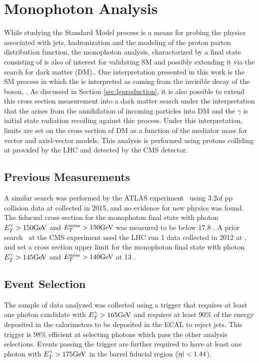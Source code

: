 
\chapter{Monophoton Analysis}\label{sec:lgxc}

While studying the Standard Model process \ppwbb is a means
 for probing the physics associated with jets,
 hadronization and the modeling of the proton 
 parton distribution function, the monophoton analysis,
 charactarized by a final state consisting of \gmet 
 is also of interest for validating SM and possibly extending it
 via the search for dark matter (DM)..
One interpretation presented in this work
 is the SM process \ppzgnng  in which the \met is interpreted as coming from the
 invisible decay of the \z boson, \znn.
As discussed in Section \ref{sec:lgproduction},
 it is also possible to extend this cross section measurement
 into a dark matter search under the interpretation 
 that the \met arises from the 
 annihilation of incoming particles into DM 
 and the $\gamma$ is initial state radiation 
 recoiling against thie process. 
Under this interpretation, limits are set on the
 cross section of DM as a function of the 
 mediator mass for vector and axiel-vector models. 
This analysis is performed using protons colliding at
  \TeV provided by the LHC and detected by
 the CMS detector.

\section{Previous Measurements}

A similar search was performed by the ATLAS experiment~\cite{Aaboud:2016uro}
 using 3.2\fbinv of pp collision data at  \TeV
 collected in 2015, and no evidence for new physics was found. 
The fiducual cross section for 
 the monophoton final state with photon $E_T^\gamma > 150 \mathrm{GeV}$
 and $E_T^{\mathrm{miss}} > 150 \mathrm{GeV}$ was measured to be below 17.8 \fbinv.
A prior search~\cite{Khachatryan:2014rwa} at the CMS 
 experiment used the LHC run 1 data collected in 2012 at
  \TeV, and set a cross section upper limit for the monophoton final
 state with photon $E_T^\gamma > 145\mathrm{GeV}$ and $E_T^{\mathrm{miss}} > 140\mathrm{GeV}$ at 13 \fbinv. 

\section{Event Selection}\label{subsec:lgevent_selection}

The sample of data analyzed was collected using 
 a trigger that requires at least one photon
 candidate with $E_T^\gamma > 165 \mathrm{GeV}$ and 
 requires at least 90\% of the energy deposited in 
 the calorimeters to be deposited in the ECAL
 to reject jets. 
This trigger is 98\% efficient at selecting photons
 which pass the other analysis selections.
Events passing the trigger are further required to
 have at least one photon with $E_T^\gamma > 175\mathrm{GeV}$
 in the barrel fiducial region ($\abs{\eta} < 1.44$).

